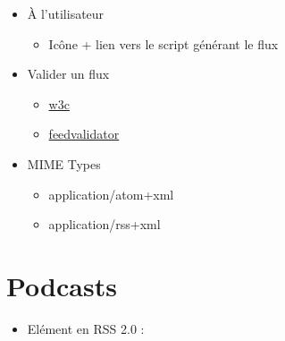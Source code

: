 \begin{itemize}
\tightlist
\item
  À l'utilisateur

  \begin{itemize}
  \tightlist
  \item
    Icône + lien vers le script générant le flux
  \end{itemize}

  \begin{otherlanguage}{english}

\begin{Shaded}
\begin{Highlighting}[]
\KeywordTok{>}
  
\end{Highlighting}
\end{Shaded}

  \end{otherlanguage}
\item
  Valider un flux

  \begin{itemize}
  \tightlist
  \item
    \href{http://validator.w3.org/feed/}{w3c}
  \item
    \href{http://www.feedvalidator.org/}{feedvalidator}
  \end{itemize}
\item
  MIME Types

  \begin{itemize}
  \tightlist
  \item
    application/atom+xml
  \item
    application/rss+xml
  \end{itemize}
\end{itemize}

\hypertarget{podcasts}{%
\section{Podcasts}\label{podcasts}}

\begin{itemize}
\tightlist
\item
  Elément en RSS 2.0 :
\end{itemize}

